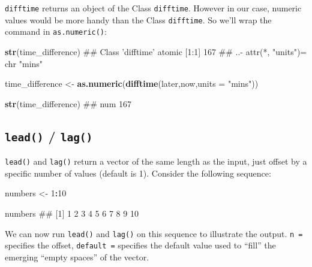 \documentclass[]{book}
\newenvironment{Shaded}{\begin{snugshade}}{\end{snugshade}}
\newcommand{\KeywordTok}[1]{\textcolor[rgb]{0.13,0.29,0.53}{\textbf{#1}}}
\newcommand{\DataTypeTok}[1]{\textcolor[rgb]{0.13,0.29,0.53}{#1}}
\newcommand{\DecValTok}[1]{\textcolor[rgb]{0.00,0.00,0.81}{#1}}
\newcommand{\StringTok}[1]{\textcolor[rgb]{0.31,0.60,0.02}{#1}}
\newcommand{\OperatorTok}[1]{\textcolor[rgb]{0.81,0.36,0.00}{\textbf{#1}}}
\newcommand{\NormalTok}[1]{#1}
\begin{document}
\texttt{difftime} returns an object of the Class \texttt{difftime}.
However in our case, numeric values would be more handy than the Class
\texttt{difftime}. So we'll wrap the command in \texttt{as.numeric()}:

\begin{Shaded}
\begin{Highlighting}[]
\KeywordTok{str}\NormalTok{(time_difference)}
\NormalTok{## Class 'difftime'  atomic [1:1] 167}
\NormalTok{##   ..- attr(*, "units")= chr "mins"}
\end{Highlighting}
\end{Shaded}

\begin{Shaded}
\begin{Highlighting}[]
\NormalTok{time_difference <-}\StringTok{ }\KeywordTok{as.numeric}\NormalTok{(}\KeywordTok{difftime}\NormalTok{(later,now,}\DataTypeTok{units =} \StringTok{"mins"}\NormalTok{))}

\KeywordTok{str}\NormalTok{(time_difference)}
\NormalTok{##  num 167}
\end{Highlighting}
\end{Shaded}

\subsection{\texorpdfstring{\texttt{lead()} /
\texttt{lag()}}{lead() / lag()}}\label{lead-lag}

\texttt{lead()} and \texttt{lag()} return a vector of the same length as
the input, just offset by a specific number of values (default is 1).
Consider the following sequence:

\begin{Shaded}
\begin{Highlighting}[]
\NormalTok{numbers <-}\StringTok{ }\DecValTok{1}\OperatorTok{:}\DecValTok{10}

\NormalTok{numbers}
\NormalTok{##  [1]  1  2  3  4  5  6  7  8  9 10}
\end{Highlighting}
\end{Shaded}

We can now run \texttt{lead()} and \texttt{lag()} on this sequence to
illustrate the output. \texttt{n\ =} specifies the offset,
\texttt{default\ =} specifies the default value used to ``fill'' the
emerging ``empty spaces'' of the vector.
\end{document}
